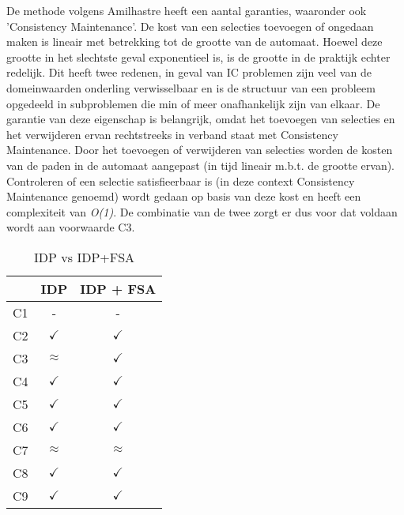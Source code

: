 De methode volgens Amilhastre heeft een aantal garanties, waaronder ook 'Consistency Maintenance'. De kost van een selecties toevoegen of ongedaan maken is lineair met betrekking tot de grootte van de automaat. Hoewel deze grootte in het slechtste geval exponentieel is, is de grootte in de praktijk echter redelijk. Dit heeft twee redenen, in geval van IC problemen zijn veel van de domeinwaarden onderling verwisselbaar en is de structuur van een probleem opgedeeld in subproblemen die min of meer onafhankelijk zijn van elkaar. De garantie van deze eigenschap is belangrijk, omdat het toevoegen van selecties en het verwijderen ervan rechtstreeks in verband staat met Consistency Maintenance. Door het toevoegen of verwijderen van selecties worden de kosten van de paden in de automaat aangepast (in tijd lineair m.b.t. de grootte ervan). Controleren of een selectie satisfieerbaar is (in deze context Consistency Maintenance genoemd) wordt gedaan op basis van deze kost en heeft een complexiteit van \textit{O(1)}. De combinatie van de twee zorgt er dus voor dat voldaan wordt aan voorwaarde C3. 

\begin{table}[]
\centering
\caption{IDP vs IDP+FSA}
\label{criteria}
\begin{tabular}{|l|c|c|}
\hline
 & IDP & IDP + FSA \\ \hline
C1 & - & - \\ \hline
C2 & $\checkmark$ & $\checkmark$ \\ \hline
C3 & $\approx$ & $\checkmark$ \\ \hline
C4 & $\checkmark$ & $\checkmark$ \\ \hline
C5 & $\checkmark$ & $\checkmark$ \\ \hline
C6 & $\checkmark$ & $\checkmark$ \\ \hline
C7 & $\approx$ & $\approx$ \\ \hline
C8 & $\checkmark$ & $\checkmark$ \\ \hline
C9 & $\checkmark$ & $\checkmark$ \\ \hline
\end{tabular}
\end{table}